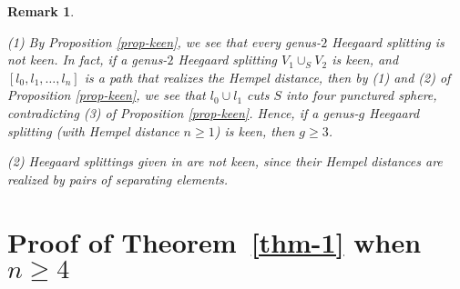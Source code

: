 \documentclass[]{aspm}
\newtheorem{remark}[definition]{Remark}
\begin{document}
\begin{remark}\label{rmk-keen}
{\rm 
(1) By Proposition \ref{prop-keen}, we see that every genus-$2$ Heegaard splitting is not keen. 
In fact, if a genus-$2$ Heegaard splitting $V_{1}\cup_{S} V_{2}$ is keen, and $[l_{0}, l_{1}, \dots, l_{n}]$ is a path that realizes the Hempel distance, then by (1) and (2) of Proposition \ref{prop-keen}, we see that $l_{0}\cup l_{1}$ cuts $S$ into four punctured sphere, contradicting (3) of Proposition \ref{prop-keen}. 
Hence, if a genus-$g$ Heegaard splitting (with Hempel distance $n\geq 1$) is keen, then $g\geq 3$. 

(2) Heegaard splittings given in \cite{IJK, Jo, QZG} are not keen, since their Hempel distances are realized by pairs of separating elements.
}
\end{remark}




\section{Proof of Theorem~\ref{thm-1} when $n\geq 4$}\label{proof1}
\end{document}
